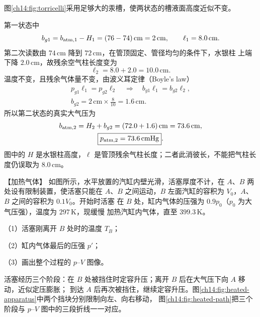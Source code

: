 {\begin{xesolution}
图\ref{ch14:fig:torricelli}采用足够大的汞槽，使两状态的槽液面高度近似不变。
\torricelliDiagram

第一状态中
\begin{equation}
  b_{g1}=b_{\rm atm,1}-H_1=(76-74)\,\mathrm{cm}=2\,\mathrm{cm},
  \qquad \ell_1=8.0\,\mathrm{cm}.
\end{equation}
第二次读数由 $74\,\mathrm{cm}$ 降到 $72\,\mathrm{cm}$，在管顶固定、管径均匀的条件下，水银柱
上端下降 $2.0\,\mathrm{cm}$，故残余空气柱长度变为
\begin{equation}
  \ell_2=8.0+2.0=10.0\,\mathrm{cm}.
\end{equation}
温度不变，且残余气体量不变，由波义耳定律（Boyle's law）
\begin{equation}
  \begin{gathered}
  p_{g1}\ell_1=p_{g2}\ell_2
  \quad\Longrightarrow\quad b_{g1}\ell_1=b_{g2}\ell_2,
  \\
  b_{g2}=2\,\mathrm{cm}\times\frac{8}{10}=1.6\,\mathrm{cm}.
  \end{gathered}
\end{equation}
所以第二状态的真实大气压为
\begin{equation}
  \begin{gathered}
  b_{\rm atm,2}=H_2+b_{g2}=(72.0+1.6)\,\mathrm{cm}=73.6\,\mathrm{cm},
  \\
  \boxed{p_{\rm atm,2}=73.6\,\mathrm{cmHg}}.
  \end{gathered}
\end{equation}
图中的 $H$ 是水银柱高度，$\ell$ 是管顶残余气柱长度；二者此消彼长，不能把气柱长度仍误取为
$8.0\,\mathrm{cm}$。
\end{xesolution}

\begin{origexamplebox}{【加热气体】}\label{ch14:ex:s28-19-6}
如图所示，水平放置的汽缸内壁光滑，活塞厚度不计，在 $A$、$B$ 两处设有限制装置，使活塞只能在
$A$、$B$ 之间运动，$B$ 左面汽缸的容积为 $V_0$，$A$、$B$ 之间的容积为 $0.1V_0$。开始时活塞
在 $B$ 处，缸内气体的压强为 $0.9p_0$（$p_0$ 为大气压强），温度为 $297\,\mathrm K$，现缓慢
加热汽缸内气体，直至 $399.3\,\mathrm K$。

（1）活塞刚离开 $B$ 处时的温度 $T_B$；

（2）缸内气体最后的压强 $p'$；

（3）画出整个过程的 $p$--$V$ 图像。
\exampleNineteenSixFaithful
\end{origexamplebox}

\begin{xesolution}
活塞经历三个阶段：在 $B$ 处被挡住时定容升压；离开 $B$ 后在大气压下向 $A$ 移动，近似定压膨胀；
到达 $A$ 后再次被挡住，继续定容升压。图\ref{ch14:fig:heated-apparatus}中两个挡块分别限制向左、向右移动，
图\ref{ch14:fig:heated-path}把三个阶段与 $p$--$V$ 图中的三段折线一一对应。


\end{xesolution}}
